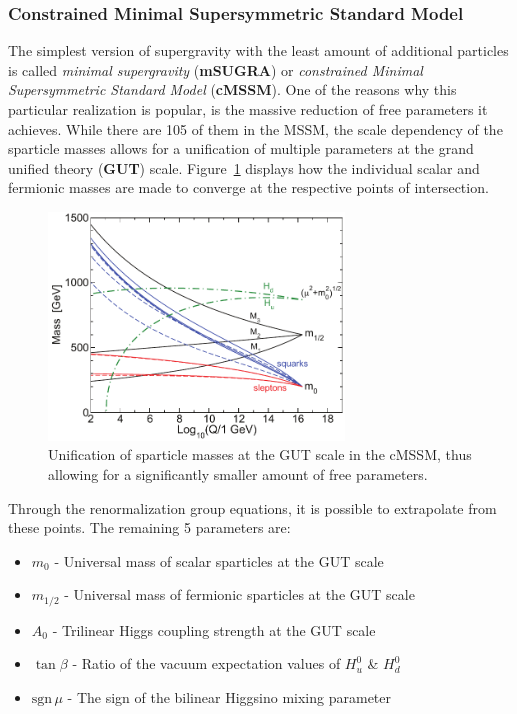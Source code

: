 \subsubsection{Constrained Minimal Supersymmetric Standard Model}

The simplest version of supergravity with the least amount of additional particles is called \textit{minimal supergravity} (\textbf{mSUGRA}) or \textit{constrained Minimal Supersymmetric Standard Model} (\textbf{cMSSM}). One of the reasons why this particular realization is popular, is the massive reduction of free parameters it achieves. While there are 105 of them in the MSSM, the scale dependency of the sparticle masses allows for a unification of multiple parameters at the grand unified theory (\textbf{GUT}) scale. Figure~\ref{fig:msugrarge} displays how the individual scalar and fermionic masses are made to converge at the respective points of intersection.

\begin{figure}[ht!]
  \centering
  \includegraphics[width=0.7\textwidth]{plots/msugrarge.pdf}
  \caption{Unification of sparticle masses at the GUT scale in the cMSSM, thus allowing for a significantly smaller amount of free parameters.}
  \label{fig:msugrarge}
\end{figure}

\noindent Through the renormalization group equations, it is possible to extrapolate from these points. The remaining 5 parameters are:

\begin{itemize}
\item $m_0$ - Universal mass of scalar sparticles at the GUT scale
\item $m_{1/2}$ - Universal mass of fermionic sparticles at the GUT scale
\item $A_0$ - Trilinear Higgs coupling strength at the GUT scale
\item $\tan{\beta}$ - Ratio of the vacuum expectation values of $H^0_u$ \& $H^0_d$
\item $\text{sgn}\,\mu$ - The sign of the bilinear Higgsino mixing parameter
\end{itemize}

